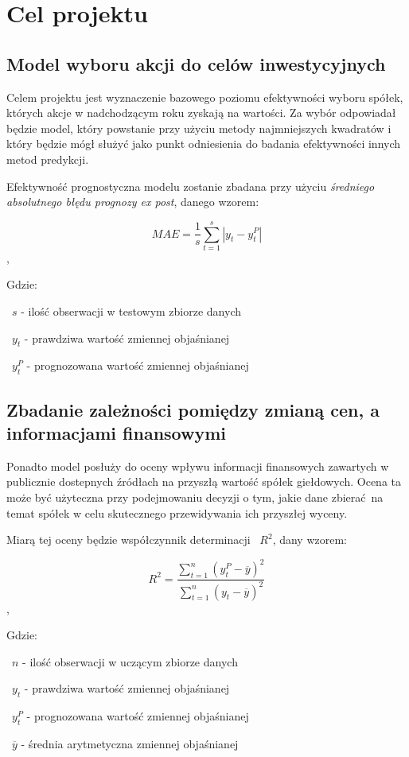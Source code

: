 \documentclass{article}
\begin{document}
\newpage
\section{Cel projektu}

\subsection{Model wyboru akcji do celów inwestycyjnych}
Celem projektu jest wyznaczenie bazowego poziomu efektywności wyboru spółek, których akcje w nadchodzącym roku zyskają na wartości. Za wybór odpowiadał będzie model, który powstanie przy użyciu metody najmniejszych kwadratów i który będzie mógł służyć jako punkt odniesienia do badania efektywności innych metod predykcji.

Efektywność prognostyczna modelu zostanie zbadana przy użyciu \textit{średniego absolutnego błędu prognozy ex post}, danego wzorem:

\[ MAE = \frac{1}{s} \sum_{t=1}^{s} | y_t - y_t^P | \],

Gdzie:

~$s$ - ilość obserwacji w testowym zbiorze danych

~$y_t$ - prawdziwa wartość zmiennej objaśnianej

~$y_t^P$ - prognozowana wartość zmiennej objaśnianej

\medskip

\subsection{Zbadanie zależności pomiędzy zmianą cen, a informacjami finansowymi}
Ponadto model posłuży do oceny wpływu informacji finansowych zawartych w publicznie dostepnych źródłach na przyszłą wartość spółek giełdowych. Ocena ta może być użyteczna przy podejmowaniu decyzji o tym, jakie dane zbierać na temat spółek w celu skutecznego przewidywania ich przyszłej wyceny.

Miarą tej oceny będzie współczynnik determinacji ~$R^2$, dany wzorem:

\[ R^2 = \frac{\sum_{t=1}^{n}(y_t^P-\overline{y})^2}{\sum_{t=1}^{n}(y_t-\overline{y})^2} \],

Gdzie:

~$n$ - ilość obserwacji w uczącym zbiorze danych

~$y_t$ - prawdziwa wartość zmiennej objaśnianej

~$y_t^P$ - prognozowana wartość zmiennej objaśnianej

~$\overline{y}$ - średnia arytmetyczna zmiennej objaśnianej
\end{document}
